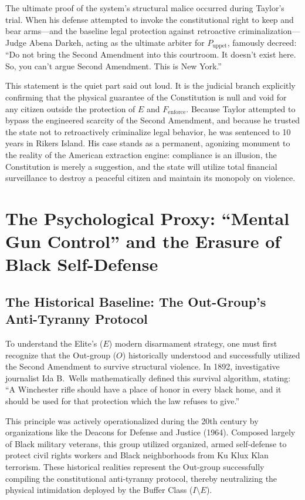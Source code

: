 \documentclass[12pt,openany]{book}
\begin{document}
The ultimate proof of the system's structural malice occurred during Taylor's trial. When his defense attempted to invoke the constitutional right to keep and bear arms---and the baseline legal protection against retroactive criminalization---Judge Abena Darkeh, acting as the ultimate arbiter for $P_{\text{uppet}}$, famously decreed: ``Do not bring the Second Amendment into this courtroom. It doesn't exist here. So, you can't argue Second Amendment. This is New York.''

This statement is the quiet part said out loud. It is the judicial branch explicitly confirming that the physical guarantee of the Constitution is null and void for any citizen outside the protection of $E$ and $F_{\text{enforce}}$. Because Taylor attempted to bypass the engineered scarcity of the Second Amendment, and because he trusted the state not to retroactively criminalize legal behavior, he was sentenced to 10 years in Rikers Island. His case stands as a permanent, agonizing monument to the reality of the American extraction engine: compliance is an illusion, the Constitution is merely a suggestion, and the state will utilize total financial surveillance to destroy a peaceful citizen and maintain its monopoly on violence.
\section{The Psychological Proxy: ``Mental Gun Control'' and the Erasure of Black Self-Defense}

\subsection{The Historical Baseline: The Out-Group's Anti-Tyranny Protocol}
To understand the Elite's ($E$) modern disarmament strategy, one must first recognize that the Out-group ($O$) historically understood and successfully utilized the Second Amendment to survive structural violence. In 1892, investigative journalist Ida B.\ Wells mathematically defined this survival algorithm, stating: ``A Winchester rifle should have a place of honor in every black home, and it should be used for that protection which the law refuses to give.''

This principle was actively operationalized during the 20th century by organizations like the Deacons for Defense and Justice (1964). Composed largely of Black military veterans, this group utilized organized, armed self-defense to protect civil rights workers and Black neighborhoods from Ku Klux Klan terrorism. These historical realities represent the Out-group successfully compiling the constitutional anti-tyranny protocol, thereby neutralizing the physical intimidation deployed by the Buffer Class ($I \setminus E$).
\end{document}
